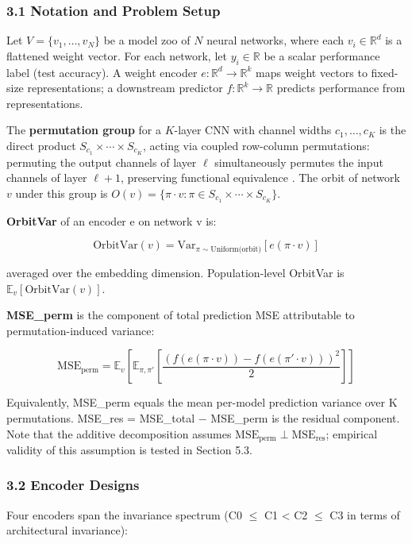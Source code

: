 
\subsubsection{3.1 Notation and Problem Setup}

Let $V = \{v_1, \ldots, v_N\}$ be a model zoo of $N$ neural networks, where each $v_i \in \mathbb{R}^d$ is a flattened weight vector. For each network, let $y_i \in \mathbb{R}$ be a scalar performance label (test accuracy). A weight encoder $e: \mathbb{R}^d \rightarrow \mathbb{R}^k$ maps weight vectors to fixed-size representations; a downstream predictor $f: \mathbb{R}^k \rightarrow \mathbb{R}$ predicts performance from representations.

The \textbf{permutation group} for a $K$-layer CNN with channel widths $c_1, \ldots, c_K$ is the direct product $S_{c_1} \times \cdots \times S_{c_K}$, acting via coupled row-column permutations: permuting the output channels of layer $\ell$ simultaneously permutes the input channels of layer $\ell+1$, preserving functional equivalence \citep{Navon2023Equivariant}. The orbit of network $v$ under this group is $O(v) = \{\pi \cdot v : \pi \in S_{c_1} \times \cdots \times S_{c_K}\}$.

\textbf{OrbitVar} of an encoder e on network v is:

$$\text{OrbitVar}(v) = \text{Var}_{\pi \sim \text{Uniform(orbit)}}[e(\pi \cdot v)]$$

averaged over the embedding dimension. Population-level OrbitVar is $\mathbb{E}_v[\text{OrbitVar}(v)]$.

\textbf{MSE\_perm} is the component of total prediction MSE attributable to permutation-induced variance:

$$\text{MSE}_{\text{perm}} = \mathbb{E}_v\left[\mathbb{E}_{\pi, \pi'}\left[\frac{(f(e(\pi \cdot v)) - f(e(\pi' \cdot v)))^2}{2}\right]\right]$$

Equivalently, MSE\_perm equals the mean per-model prediction variance over K permutations. MSE\_res = MSE\_total $-$ MSE\_perm is the residual component. Note that the additive decomposition assumes $\text{MSE}_\text{perm} \perp \text{MSE}_\text{res}$; empirical validity of this assumption is tested in Section 5.3.

\subsubsection{3.2 Encoder Designs}

Four encoders span the invariance spectrum (C0 $\leq$ C1 < C2 $\leq$ C3 in terms of architectural invariance):

